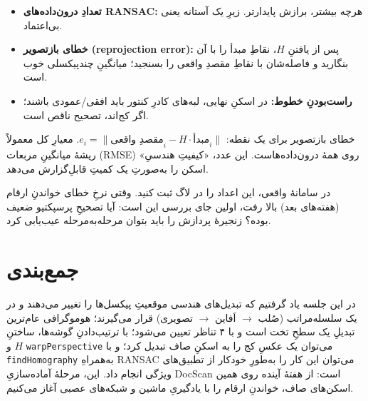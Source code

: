 \documentclass[12pt,a4paper]{article}
\begin{document}
\begin{itemize}
  \item \textbf{تعدادِ درون‌داده‌های RANSAC:} هرچه بیشتر، برازش پایدارتر. زیرِ یک آستانه یعنی بی‌اعتماد.
  \item \textbf{خطای بازتصویر (reprojection error):} پس از یافتنِ $H$، نقاطِ مبدأ را با آن بنگارید و فاصله‌شان با نقاطِ مقصدِ واقعی را بسنجید؛ میانگینِ چند‌پیکسلی خوب است.
  \item \textbf{راست‌بودنِ خطوط:} در اسکنِ نهایی، لبه‌های کادرِ کنتور باید افقی/عمودی باشند؛ اگر کج‌اند، تصحیح ناقص است.
\end{itemize}

\begin{riyazi}
خطای بازتصویر برای یک نقطه: $e_i = \lVert \text{مقصدِ واقعی}_i - H\cdot\text{مبدأ}_i \rVert$. معیارِ کل معمولاً ریشهٔ میانگینِ مربعات (RMSE) روی همهٔ درون‌داده‌هاست. این عدد، «کیفیتِ هندسیِ» اسکن را به‌صورتِ یک کمیتِ قابلِ‌گزارش می‌دهد.
\end{riyazi}

\begin{yaddasht}
در سامانهٔ واقعی، این اعداد را در لاگ ثبت کنید. وقتی نرخِ خطای خواندنِ ارقام (هفته‌های بعد) بالا رفت، اولین جای بررسی این است: آیا تصحیحِ پرسپکتیو ضعیف بوده؟ زنجیرهٔ پردازش را باید بتوان مرحله‌به‌مرحله عیب‌یابی کرد.
\end{yaddasht}

\section{جمع‌بندی}

در این جلسه یاد گرفتیم که تبدیل‌های هندسی موقعیتِ پیکسل‌ها را تغییر می‌دهند و در یک سلسله‌مراتب (صُلب $\to$ اَفاین $\to$ تصویری) قرار می‌گیرند؛ هوموگرافی عام‌ترین تبدیلِ یک سطحِ تخت است و با ۴ تناظر تعیین می‌شود؛ با ترتیب‌دادنِ گوشه‌ها، ساختنِ $H$ و \texttt{warpPerspective} می‌توان یک عکسِ کج را به اسکنِ صاف تبدیل کرد؛ و با \texttt{findHomography} به‌همراهِ RANSAC می‌توان این کار را به‌طورِ خودکار از تطبیق‌های ویژگی انجام داد. این، مرحلهٔ آماده‌سازیِ DocScan است: از هفتهٔ آینده روی همین اسکن‌های صاف، خواندنِ ارقام را با یادگیریِ ماشین و شبکه‌های عصبی آغاز می‌کنیم.
\end{document}
